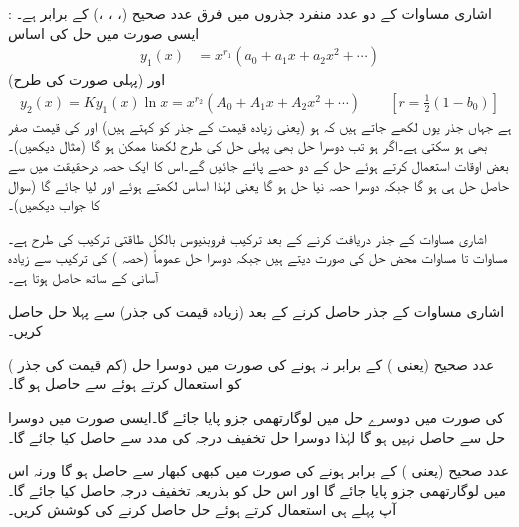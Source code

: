 : اشاری مساوات کے دو عدد  منفرد جذروں میں فرق عدد صحیح (، ، ،) کے برابر ہے۔ ایسی صورت میں حل کی اساس
\begin{align}\label{مساوات_طاقتی_فروبنیوس_حل_ٹ}
y_1(x)&=x^{r_1}(a_0+a_1x+a_2x^2+\cdots)
\end{align}
(پہلی صورت کی طرح) اور
\begin{align}\label{مساوات_طاقتی_فروبنیوس_حل_ث}
y_2(x)=Ky_1(x)\ln x=x^{r_2}(A_0+A_1x+A_2x^2+\cdots) \quad \quad [r=\frac{1}{2}(1-b_0)]
\end{align}
ہے جہاں جذر یوں لکھے جاتے ہیں کہ  ہو (یعنی زیادہ قیمت کے جذر کو  کہتے ہیں) اور  کی قیمت صفر بھی ہو سکتی ہے۔اگر  ہو تب دوسرا حل بھی پہلی حل کی طرح  لکھنا ممکن ہو گا (مثال  دیکھیں)۔ بعض اوقات  استعمال کرتے ہوئے  حل  کے دو حصے پائے جائیں گے۔اس کا ایک حصہ درحقیقت میں  سے حاصل حل  ہی ہو گا جبکہ دوسرا حصہ نیا حل ہو گا یعنی  لہٰذا اساس لکھتے ہوئے  اور  لیا جائے گا (سوال  کا جواب دیکھیں)۔

اشاری مساوات  کے جذر دریافت کرنے کے بعد ترکیب فروبنیوس بالکل طاقتی ترکیب کی طرح ہے۔ مساوات  تا مساوات  محض حل کی صورت دیتے ہیں جبکہ دوسرا حل عموماً  (حصہ ) کی ترکیب سے زیادہ آسانی کے ساتھ حاصل ہوتا ہے۔

اشاری مساوات کے جذر حاصل کرنے کے بعد (زیادہ قیمت کی جذر)  سے  پہلا حل  حاصل کریں۔

 عدد صحیح (یعنی ) کے برابر نہ ہونے کی صورت میں دوسرا حل (کم قیمت کی جذر )  کو استعمال کرتے ہوئے  سے حاصل ہو گا۔

 کی صورت میں دوسرے حل میں لوگارتھمی جزو پایا جائے گا۔ایسی صورت میں دوسرا حل  سے حاصل نہیں ہو گا لہٰذا دوسرا حل تخفیف درجہ کی مدد سے حاصل کیا جائے گا۔

  عدد صحیح (یعنی ) کے برابر ہونے کی صورت میں کبھی کبھار  سے حاصل ہو گا ورنہ اس میں لوگارتھمی جزو پایا جائے گا اور اس حل کو بذریعہ تخفیف درجہ حاصل کیا جائے گا۔آپ پہلے   ہی استعمال کرتے ہوئے حل حاصل کرنے کی کوشش کریں۔

